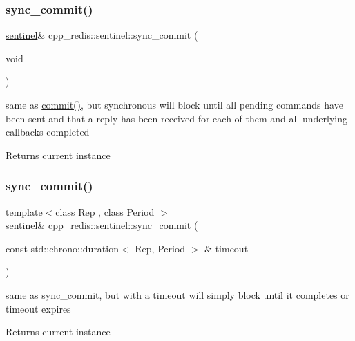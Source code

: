 \subsubsection{\texorpdfstring{sync\+\_\+commit()}{sync\_commit()}\hspace{0.1cm}{\footnotesize\ttfamily [1/2]}}
{\footnotesize\ttfamily \hyperlink{classcpp__redis_1_1sentinel}{sentinel}\& cpp\+\_\+redis\+::sentinel\+::sync\+\_\+commit (\begin{DoxyParamCaption}\item[{void}]{ }\end{DoxyParamCaption})}

same as \hyperlink{classcpp__redis_1_1sentinel_ad4f85d486499f82225b244f85091b31e}{commit()}, but synchronous will block until all pending commands have been sent and that a reply has been received for each of them and all underlying callbacks completed

\begin{DoxyReturn}{Returns}
current instance 
\end{DoxyReturn}
\mbox{\label{classcpp__redis_1_1sentinel_afbaa0b80266f70ad98c0bf8f28c533ab}} 
\subsubsection{\texorpdfstring{sync\+\_\+commit()}{sync\_commit()}\hspace{0.1cm}{\footnotesize\ttfamily [2/2]}}
{\footnotesize\ttfamily template$<$class Rep , class Period $>$ \\
\hyperlink{classcpp__redis_1_1sentinel}{sentinel}\& cpp\+\_\+redis\+::sentinel\+::sync\+\_\+commit (\begin{DoxyParamCaption}\item[{const std\+::chrono\+::duration$<$ Rep, Period $>$ \&}]{timeout }\end{DoxyParamCaption})\hspace{0.3cm}{\ttfamily [inline]}}

same as sync\+\_\+commit, but with a timeout will simply block until it completes or timeout expires

\begin{DoxyReturn}{Returns}
current instance 
\end{DoxyReturn}
\mbox{\label{classcpp__redis_1_1sentinel_ad27b6a3558e6d3a634df11dca80154df}} 
